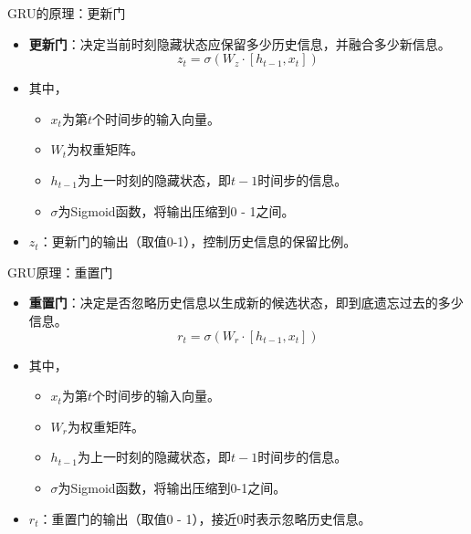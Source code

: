 \begin{frame}{GRU的原理：更新门}
    \begin{itemize}
        \item \textbf{更新门}：决定当前时刻隐藏状态应保留多少历史信息，并融合多少新信息。
        \begin{equation*}
            z_t = \sigma(W_z \cdot [h_{t-1},x_t])
        \end{equation*}
        \item 其中，
        \begin{itemize}
            \item \(x_t\)为第\(t\)个时间步的输入向量。
            \item \(W_t\)为权重矩阵。
            \item \(h_{t-1}\)为上一时刻的隐藏状态，即\(t-1\)时间步的信息。
            \item \(\sigma\)为Sigmoid函数，将输出压缩到0 - 1之间。
        \end{itemize}
        \item \(z_t\)：更新门的输出（取值0-1），控制历史信息的保留比例。
    \end{itemize}
\end{frame}


\begin{frame}{GRU原理：重置门}
    \begin{itemize}
        \item \textbf{重置门}：决定是否忽略历史信息以生成新的候选状态，即到底遗忘过去的多少信息。
        \begin{equation*}
            r_t = \sigma(W_r \cdot [h_{t-1},x_t])
        \end{equation*}
        \item 其中，
        \begin{itemize}
            \item \(x_t\)为第\(t\)个时间步的输入向量。
            \item \(W_r\)为权重矩阵。
            \item \(h_{t-1}\)为上一时刻的隐藏状态，即\(t-1\)时间步的信息。
            \item \(\sigma\)为Sigmoid函数，将输出压缩到0-1之间。
        \end{itemize}
        \item \(r_t\)：重置门的输出（取值0 - 1），接近0时表示忽略历史信息。
    \end{itemize}
\end{frame}


